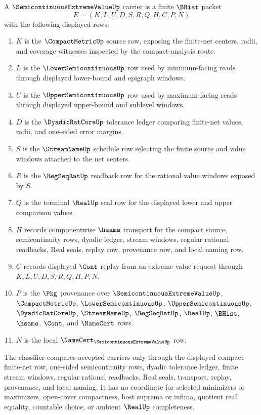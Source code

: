 \begin{definition}
\label{def:semicontinuous-extreme-value-carrier}
A $\SemicontinuousExtremeValueUp$ carrier is a finite $\BHist$ packet
$$
E=(K,L,U,D,S,R,Q,H,C,P,N)
$$
with the following displayed rows:
\begin{enumerate}
\item $K$ is the $\CompactMetricUp$ source row, exposing the finite-net centers, radii, and coverage witnesses inspected by the compact-analysis route.
\item $L$ is the $\LowerSemicontinuousUp$ row used by minimum-facing reads through displayed lower-bound and epigraph windows.
\item $U$ is the $\UpperSemicontinuousUp$ row used by maximum-facing reads through displayed upper-bound and sublevel windows.
\item $D$ is the $\DyadicRatCoreUp$ tolerance ledger comparing finite-net values, radii, and one-sided error margins.
\item $S$ is the $\StreamNameUp$ schedule row selecting the finite source and value windows attached to the net centers.
\item $R$ is the $\RegSeqRatUp$ readback row for the rational value windows exposed by $S$.
\item $Q$ is the terminal $\RealUp$ seal row for the displayed lower and upper comparison values.
\item $H$ records componentwise $\hsame$ transport for the compact source, semicontinuity rows, dyadic ledger, stream windows, regular rational readbacks, Real seals, replay row, provenance row, and local naming row.
\item $C$ records displayed $\Cont$ replay from an extreme-value request through $K,L,U,D,S,R,Q,H,P,N$.
\item $P$ is the $\Pkg$ provenance over $\SemicontinuousExtremeValueUp$, $\CompactMetricUp$, $\LowerSemicontinuousUp$, $\UpperSemicontinuousUp$, $\DyadicRatCoreUp$, $\StreamNameUp$, $\RegSeqRatUp$, $\RealUp$, $\BHist$, $\hsame$, $\Cont$, and $\NameCert$ rows.
\item $N$ is the local $\NameCert_{\SemicontinuousExtremeValueUp}$ row.
\end{enumerate}
The classifier compares accepted carriers only through the displayed compact finite-net row, one-sided semicontinuity rows, dyadic tolerance ledger, finite stream windows, regular rational readbacks, Real seals, transport, replay, provenance, and local naming. It has no coordinate for selected minimizers or maximizers, open-cover compactness, host suprema or infima, quotient real equality, countable choice, or ambient $\RealUp$ completeness.
\end{definition}

